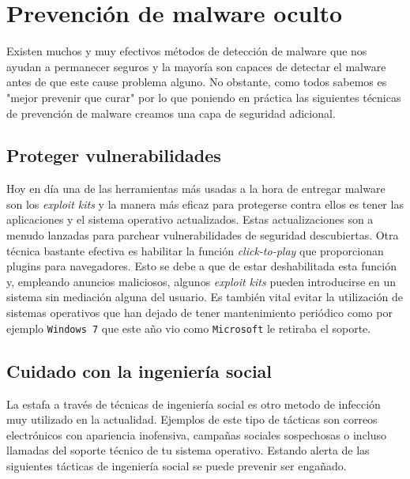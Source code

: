 \documentclass[12pt]{article}
\begin{document}
    \section{Prevención de malware oculto}
        Existen muchos y muy efectivos métodos de detección de malware que nos ayudan a permanecer seguros y la mayoría son capaces de detectar el malware antes de que este cause problema alguno. No obstante, como todos sabemos es "mejor prevenir que curar" por lo que poniendo en práctica las siguientes técnicas de prevención de malware creamos una capa de seguridad adicional.

        \subsection{Proteger vulnerabilidades}
            Hoy en día una de las herramientas más usadas a la hora de entregar malware son los \textit{exploit kits} y la manera más eficaz para protegerse contra ellos es tener las aplicaciones y el sistema operativo actualizados. Estas actualizaciones son a menudo lanzadas para parchear vulnerabilidades de seguridad descubiertas. Otra técnica bastante efectiva es habilitar la función \textit{click-to-play} que proporcionan plugins para navegadores. Esto se debe a que de estar deshabilitada esta función y, empleando anuncios maliciosos, algunos \textit{exploit kits} pueden introducirse en un sistema sin mediación alguna del usuario. Es también vital evitar la utilización de sistemas operativos que han dejado de tener mantenimiento periódico como por ejemplo \texttt{Windows 7} que este año vio como \texttt{Microsoft} le retiraba el soporte.

        \subsection{Cuidado con la ingeniería social}
            La estafa a través de técnicas de ingeniería social es otro metodo de infección muy utilizado en la actualidad. Ejemplos de este tipo de tácticas son correos electrónicos con apariencia inofensiva, campañas sociales sospechosas o incluso llamadas del soporte técnico de tu sistema operativo. Estando alerta de las siguientes tácticas de ingeniería social se puede prevenir ser engañado.
\end{document}
